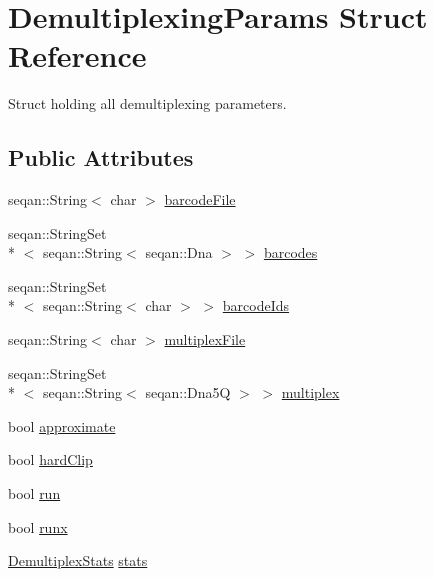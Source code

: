 \hypertarget{struct_demultiplexing_params}{\section{Demultiplexing\-Params Struct Reference}
\label{struct_demultiplexing_params}
}


Struct holding all demultiplexing parameters.  


\subsection*{Public Attributes}
\begin{DoxyCompactItemize}
\item 
seqan\-::\-String$<$ char $>$ \hyperlink{struct_demultiplexing_params_a2b2b682fbf21f3ca8daafe3e9b83c0ca}{barcode\-File}
\item 
seqan\-::\-String\-Set\\*
$<$ seqan\-::\-String$<$ seqan\-::\-Dna $>$ $>$ \hyperlink{struct_demultiplexing_params_aaeea114c00f19f6565047e507a74f90f}{barcodes}
\item 
seqan\-::\-String\-Set\\*
$<$ seqan\-::\-String$<$ char $>$ $>$ \hyperlink{struct_demultiplexing_params_a1721fa9ad83112b0d2df9c2932bd00be}{barcode\-Ids}
\item 
seqan\-::\-String$<$ char $>$ \hyperlink{struct_demultiplexing_params_a93d9e02c35225dac383b7c52f7b539f7}{multiplex\-File}
\item 
seqan\-::\-String\-Set\\*
$<$ seqan\-::\-String$<$ seqan\-::\-Dna5\-Q $>$ $>$ \hyperlink{struct_demultiplexing_params_a6d5a685bccab390519e4b423018443f7}{multiplex}
\item 
bool \hyperlink{struct_demultiplexing_params_ae76872bea7b75ea020035f7825fc8210}{approximate}
\item 
bool \hyperlink{struct_demultiplexing_params_a28920791fd2dfa590dade23f2924b93a}{hard\-Clip}
\item 
bool \hyperlink{struct_demultiplexing_params_a4a52e0b0dbbacf3e1d4e2b115f3d8cf7}{run}
\item 
bool \hyperlink{struct_demultiplexing_params_aa7bf93a371b34c9ad7ae0a5dc8edc8c5}{runx}
\item 
\hyperlink{struct_demultiplex_stats}{Demultiplex\-Stats} \hyperlink{struct_demultiplexing_params_a1017a69229d12a8a3714f80e75c3dbb9}{stats}
\end{DoxyCompactItemize}


